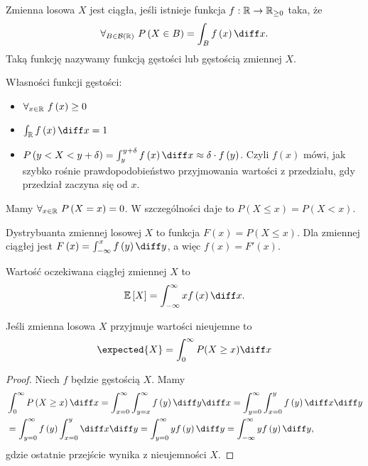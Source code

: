 \begin{definition}
    Zmienna losowa $X$ jest ciągła, jeśli istnieje funkcja $f: \mathbb{R}\to \mathbb{R}_{\ge 0}$ taka, że 
    $$\forall_{B\in \mathcal{B\left( \R \right) }} \ P\left( X\in B  \right) = \int_{B} f\left( x  \right) \diff x .$$
    Taką funkcję nazywamy funkcją gęstości lub gęstością zmiennej $X$.
\end{definition}

    Własności funkcji gęstości:
    \begin{itemize}
        \item $\forall_{x\in \mathbb{R}} \ f\left( x  \right) \ge 0 $
        \item $\int_{\R} f\left( x  \right) \diff x = 1$
        \item $P\left( y<X<y+\delta \right) = \int_{y}^{y+\delta} f\left( x  \right) \diff x \approx \delta\cdot f\left( y \right)  $. Czyli $f\left( x  \right) $ mówi, jak szybko rośnie prawdopodobieństwo przyjmowania wartości z przedziału, gdy przedział zaczyna się od $x$.
    \end{itemize}

    Mamy $\forall_{x\in \mathbb{R}} \ P\left( X=x \right) =0 $. W szczególności daje to $P\left( X\le x  \right) = P\left( X<x \right) $.

\begin{definition}
    Dystrybuanta zmiennej losowej $X$ to funkcja $F\left( x  \right) = P\left( X\le x  \right) $. Dla zmiennej ciągłej jest $F\left( x  \right) = \int_{-\infty}^{x} f\left( y  \right) \diff y $, a więc $f\left( x  \right) = F'\left( x  \right) $.
\end{definition}

\begin{definition}
    Wartość oczekiwana ciągłej zmiennej $X$ to 
    $$ \mathbb{E}\left[  X \right] = \int_{-\infty}^{\infty} x f\left( x  \right) \diff x  .$$ 
\end{definition}


\begin{lemma}[Lemat 8.1 P\&C]
    \label{continuous-positive-random-variable-lemma}
    Jeśli zmienna losowa $X$ przyjmuje wartości nieujemne to
    \[
        \expected{X} = \int_0^\infty P(X \geq x) \diff x
    \]
\end{lemma}
\begin{proof}
    Niech $f$ będzie gęstością $X$. Mamy
    \begin{align*}
       & \int_{0}^{\infty} P\left( X\ge x  \right) \diff x = \int_{x=0}^{\infty}  \int_{y=x}^{\infty} f\left( y  \right) \diff y \diff x = \int_{y=0}^{\infty} \int_{x=0}^{y} f\left( y  \right) \diff x \diff y \\ 
        &= \int_{y=0}^{\infty} f\left( y  \right) \int_{x=0}^{y} \diff x \diff y = \int_{y=0}^{\infty} y f\left( y  \right) \diff y = \int_{-\infty}^{\infty} y f\left( y  \right) \diff y,
    \end{align*}
    gdzie ostatnie przejście wynika z nieujemności $X$.
\end{proof}

